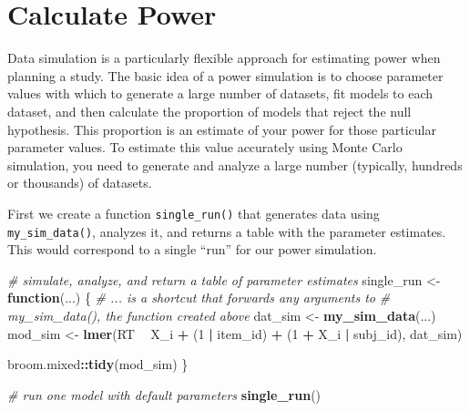 \documentclass[
  english,
  doc,floatsintext]{apa6}
\newenvironment{Shaded}{\begin{snugshade}}{\end{snugshade}}
\newcommand{\CommentTok}[1]{\textcolor[rgb]{0.56,0.35,0.01}{\textit{#1}}}
\newcommand{\ControlFlowTok}[1]{\textcolor[rgb]{0.13,0.29,0.53}{\textbf{#1}}}
\newcommand{\DecValTok}[1]{\textcolor[rgb]{0.00,0.00,0.81}{#1}}
\newcommand{\KeywordTok}[1]{\textcolor[rgb]{0.13,0.29,0.53}{\textbf{#1}}}
\newcommand{\NormalTok}[1]{#1}
\newcommand{\OperatorTok}[1]{\textcolor[rgb]{0.81,0.36,0.00}{\textbf{#1}}}
\newcommand{\StringTok}[1]{\textcolor[rgb]{0.31,0.60,0.02}{#1}}
\begin{document}
\hypertarget{calculate-power}{%
\section{Calculate Power}\label{calculate-power}}

Data simulation is a particularly flexible approach for estimating power when planning a study. The basic idea of a power simulation is to choose parameter values with which to generate a large number of datasets, fit models to each dataset, and then calculate the proportion of models that reject the null hypothesis. This proportion is an estimate of your power for those particular parameter values. To estimate this value accurately using Monte Carlo simulation, you need to generate and analyze a large number (typically, hundreds or thousands) of datasets.

First we create a function \texttt{single\_run()} that generates data using \texttt{my\_sim\_data()}, analyzes it, and returns a table with the parameter estimates. This would correspond to a single \enquote{run} for our power simulation.

\begin{Shaded}
\begin{Highlighting}[]
\CommentTok{# simulate, analyze, and return a table of parameter estimates}
\NormalTok{single_run <-}\StringTok{ }\ControlFlowTok{function}\NormalTok{(...) \{}
  \CommentTok{# ... is a shortcut that forwards any arguments to }
  \CommentTok{# my_sim_data(), the function created above}
\NormalTok{  dat_sim <-}\StringTok{ }\KeywordTok{my_sim_data}\NormalTok{(...)}
\NormalTok{  mod_sim <-}\StringTok{ }\KeywordTok{lmer}\NormalTok{(RT }\OperatorTok{~}\StringTok{ }\NormalTok{X_i }\OperatorTok{+}\StringTok{ }\NormalTok{(}\DecValTok{1} \OperatorTok{|}\StringTok{ }\NormalTok{item_id) }\OperatorTok{+}\StringTok{ }\NormalTok{(}\DecValTok{1} \OperatorTok{+}\StringTok{ }\NormalTok{X_i }\OperatorTok{|}\StringTok{ }\NormalTok{subj_id),}
\NormalTok{                dat_sim)}
  
\NormalTok{  broom.mixed}\OperatorTok{::}\KeywordTok{tidy}\NormalTok{(mod_sim)}
\NormalTok{\}}
\end{Highlighting}
\end{Shaded}

\begin{Shaded}
\begin{Highlighting}[]
\CommentTok{# run one model with default parameters}
\KeywordTok{single_run}\NormalTok{()}
\end{Highlighting}
\end{Shaded}
\end{document}
